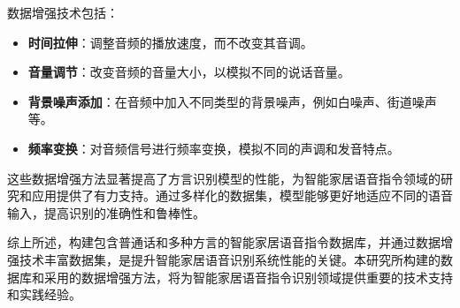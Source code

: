 \documentclass[lang=cn,cite=super]{elegantpaper}
\begin{document}
数据增强技术包括：
\begin{itemize}
    \item \textbf{时间拉伸}：调整音频的播放速度，而不改变其音调。
    \item \textbf{音量调节}：改变音频的音量大小，以模拟不同的说话音量。
    \item \textbf{背景噪声添加}：在音频中加入不同类型的背景噪声，例如白噪声、街道噪声等。
    \item \textbf{频率变换}：对音频信号进行频率变换，模拟不同的声调和发音特点。
\end{itemize}

这些数据增强方法显著提高了方言识别模型的性能，为智能家居语音指令领域的研究和应用提供了有力支持。通过多样化的数据集，模型能够更好地适应不同的语音输入，提高识别的准确性和鲁棒性。

综上所述，构建包含普通话和多种方言的智能家居语音指令数据库，并通过数据增强技术丰富数据集，是提升智能家居语音识别系统性能的关键。本研究所构建的数据库和采用的数据增强方法，将为智能家居语音指令识别领域提供重要的技术支持和实践经验。
\end{document}
